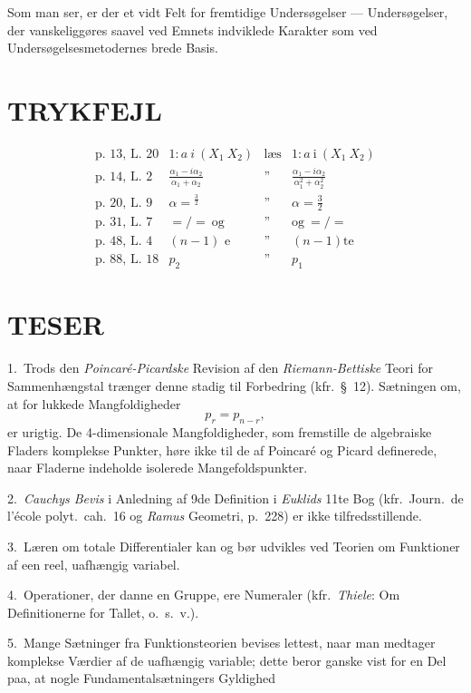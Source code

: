 \documentclass{article}
\begin{document}
Som man ser, er der et vidt Felt for fremtidige Undersøgelser --- Undersøgelser, der vanskeliggøres saavel ved Emnets indviklede Karakter som ved Undersøgelsesmetodernes brede Basis.

\section*{TRYKFEJL}

\[
\begin{array}{llll}
\text{p.\ 13, L.\ 20} & 1 : a\ i\ (X_1\ X_2) & \text{læs} & 1 : a\ \text{i}\ (X_1\ X_2) \\[6pt]
\text{p.\ 14, L.\ 2}  & \frac{\alpha_1 - i\alpha_2}{\alpha_1 + \alpha_2} & \text{''} & \frac{\alpha_1 - i\alpha_2}{\alpha_1^2 + \alpha_2^2} \\[12pt]
\text{p.\ 20, L.\ 9}  & \alpha = {}^{\frac{3}{2}} & \text{''} & \alpha = \frac{3}{2} \\[6pt]
\text{p.\ 31, L.\ 7}  & =/\!=\ \text{og} & \text{''} & \text{og}\ =/\!= \\[6pt]
\text{p.\ 48, L.\ 4}  & (n-1)\text{ e} & \text{''} & (n-1)\text{te} \\[6pt]
\text{p.\ 88, L.\ 18} & p_2 & \text{''} & p_1
\end{array}
\]

\section*{TESER}

1.~Trods den \emph{Poincaré-Picardske} Revision af den \emph{Riemann-Bettiske} Teori for Sammenhængstal trænger denne stadig til Forbedring (kfr.\ \S~12). Sætningen om, at for lukkede Mangfoldigheder
\[
p_r = p_{n-r},
\]
er urigtig. De 4-dimensionale Mangfoldigheder, som fremstille de algebraiske Fladers komplekse Punkter, høre ikke til de af Poincaré og Picard definerede, naar Fladerne indeholde isolerede Mangefoldspunkter.

2.~\emph{Cauchys Bevis} i Anledning af 9de Definition i \emph{Euklids} 11te Bog (kfr.\ Journ.\ de l'école polyt.\ cah.\ 16 og \emph{Ramus} Geometri, p.\ 228) er ikke tilfredsstillende.

3.~Læren om totale Differentialer kan og bør udvikles ved Teorien om Funktioner af een reel, uafhængig variabel.

4.~Operationer, der danne en Gruppe, ere Numeraler (kfr.\ \emph{Thiele}: Om Definitionerne for Tallet, o.\ s.\ v.).

5.~Mange Sætninger fra Funktionsteorien bevises lettest, naar man medtager komplekse Værdier af de uafhængig variable; dette beror ganske vist for en Del paa, at nogle Fundamentalsætningers Gyldighed
\end{document}
